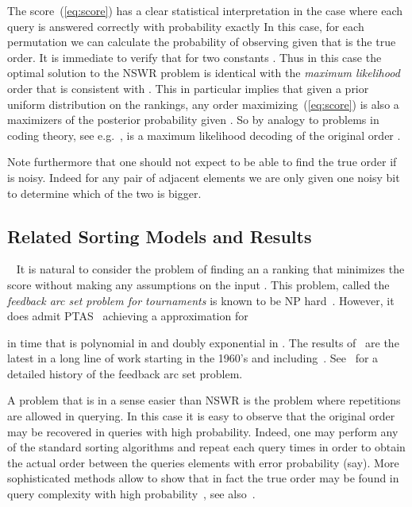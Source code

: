 \documentclass[11pt]{article}
\begin{document}
The score~(\ref{eq:score}) has a clear statistical interpretation in the 
case where each query is answered correctly with probability  exactly
In this case, for each permutation  we can calculate the probability 
 of observing  given that  is the true order. It is 
immediate to verify that  
for two constants  . Thus in this case the optimal solution to the 
NSWR problem is identical with the {\em maximum likelihood} order that is 
consistent with . This in particular implies that given a prior uniform 
distribution on the  rankings, any order  
maximizing~(\ref{eq:score}) is also a maximizers of the posterior probability 
given . So by analogy to problems in coding theory, 
see e.g.~\cite{Romann:97},  
 is a maximum likelihood decoding of the original order .  
 
Note furthermore that one should not expect to be able to find the true order 
if  is noisy. Indeed for any pair of adjacent elements we are only given 
one noisy bit to determine which of the two is bigger. 

\subsection{Related Sorting Models and Results}~\label{subsec:related} 
It is natural to consider the problem of finding an a ranking  that 
minimizes the score  without making any assumptions on the input 
. This problem, called the {\em feedback arc set problem for tournaments}  
is known to be NP hard~\cite{AiChNe:05,Alon:06}. 
However, it does admit PTAS~\cite{KenyonSchudy:07} achieving a  
approximation for 

in time that is polynomial in  and doubly exponential in .
The results of~\cite{KenyonSchudy:07} are the latest in a long line of work 
starting in the 1960's and including~\cite{AiChNe:05,Alon:06}. 
See~\cite{KenyonSchudy:07} 
for a detailed history of the feedback arc set problem. 
 
A problem that is in a sense easier than NSWR is the problem where 
repetitions are allowed in querying. 
In this case it is easy to observe that the original 
order may be recovered in  queries with high probability. 
Indeed, one may perform any of the standard  sorting 
algorithms and repeat each query  times in order to obtain the 
actual order between the queries elements with error probability  (say). 
More sophisticated methods allow to show that in fact the true order may be 
found in query complexity  with high probability~\cite{FPRU:90}, 
see also~\cite{KarpKleinberg:07}. 
\end{document}
